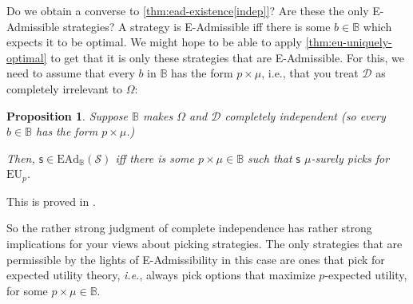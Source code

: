 \documentclass[a4paper,final]{article}
\newtheorem{proposition}[theorem]{Proposition}
\newcommand\EU{\mathrm{EU}}
\newcommand\EAd{\mathrm{EAd}}
\newcommand{\D}{\mathcal{D}}
\newcommand{\Decs}{\mathcal{D}}
\renewcommand\S{\mathcal{S}}
\newcommand\s{\mathsf{s}}
\newcommand{\IB}{\mathbb{B}}
\renewcommand{\color}[1]{}
\newcommand{\Strategies}{\S}
\newenvironment{CCM rewritten}
{\begingroup\color{blue}} %
{\endgroup}              %
\begin{document}
Do we obtain a converse to \cref{thm:ead-existence[indep]}?  Are these the only E-Admissible strategies? 
A strategy is E-Admissible iff there is some $b\in\IB$ which expects it to be optimal.
We might hope to be able to apply \cref{thm:eu-uniquely-optimal} to get that it is only these strategies that are E-Admissible. For this, we need to assume that every $b$ in $\IB$ has the form $p\times\mu$, i.e., that you treat $\D$ as completely irrelevant to $\Omega$:


\begin{proposition}\label{thm:ead-equiv[indep]} 	Suppose $\IB$ makes $\Omega$ and $\Decs$ completely independent (so every $b\in\IB$ has the form $p\times\mu$.)
	
	Then, $\s\in\EAd_\IB(\Strategies)$ iff there is some $p\times \mu\in\IB$ such that $\s$ $\mu$-surely picks for $\EU_p$. 
\end{proposition}

This is proved in .

So the rather strong judgment of complete independence has rather strong implications for your views about picking strategies. The only strategies that are permissible by the lights of E-Admissibility in this case are ones that pick for expected utility theory, \emph{i.e.}, always pick options that maximize $p$-expected utility, for some $p\times \mu\in\IB$.

\end{document}
